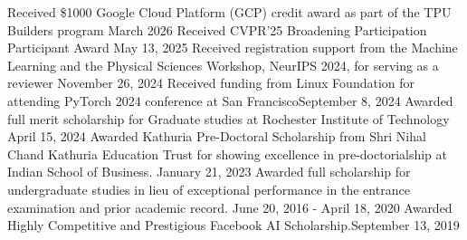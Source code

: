 %
%
%


\begin{awards}
    \award
    {Received \$1000 Google Cloud Platform (GCP) credit award as part of the TPU Builders program}
    {March 2026}
    \award
    {
    Received CVPR'25 Broadening Participation Participant Award
    } {May 13, 2025}
    \award
    {Received registration support from the Machine Learning and the Physical Sciences Workshop, NeurIPS 2024, for serving as a reviewer} {November 26, 2024}
    \award
    {Received funding from Linux Foundation for attending PyTorch 2024 conference at San Francisco}{September 8, 2024}
    \award
    {Awarded full merit scholarship for Graduate studies at Rochester Institute of Technology} {April 15, 2024}
    \award
    {Awarded Kathuria Pre-Doctoral Scholarship from Shri Nihal Chand Kathuria Education Trust for showing excellence in pre-doctorialship at Indian School of Business.} {January 21, 2023}
    \award
    {Awarded full scholarship for undergraduate studies in lieu of exceptional performance in the entrance examination and prior academic record.} {June 20, 2016 - April 18, 2020}
    \award
    {Awarded Highly Competitive and Prestigious Facebook AI Scholarship.}{September 13, 2019}
\end{awards}
